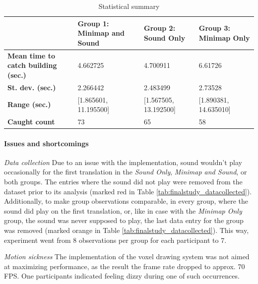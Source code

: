 \begin{table}[h]
	\caption{Statistical summary}
	\label{tab:final_study_stats}
	
	\begin{tabularx}{\linewidth}{|X|X|X|X|}
		\hline
		& \textbf{Group 1: Minimap and Sound} & \textbf{Group 2: Sound Only} & \textbf{Group 3: Minimap Only} \\ \hline
		\textbf{Mean time to catch building (sec.)}  & 4.662725                            & 4.700911                     & 6.61726                        \\ \hline
		\textbf{St. dev. (sec.)}  & 2.266442                            & 2.483499                     & 2.73528                        \\ \hline
		\textbf{Range (sec.)} & {[}1.865601, 11.195500{]}           & {[}1.567505, 13.192500{]}    & {[}1.890381, 14.635010{]}      \\ \hline
		\textbf{Caught count}  & 73                                  & 65                           & 58                             \\ \hline
	\end{tabularx}
\end{table}

\paragraph{Issues and shortcomings} \hfill

\textit{Data collection} Due to an issue with the implementation, sound wouldn't play occasionally for the first translation in the \textit{Sound Only}, \textit{Minimap and Sound}, or both groups. The entries where the sound did not play were removed from the dataset prior to its analysis (marked red in Table \ref{tab:finalstudy_datacollected}). Additionally, to make group observations comparable, in every group, where the sound did play on the first translation, or, like in case with the \textit{Minimap Only} group, the sound was never supposed to play, the last data entry for the group was removed (marked orange in Table \ref{tab:finalstudy_datacollected}). This way, experiment went from 8 observations per group for each participant to 7.

\textit{Motion sickness} The implementation of the voxel drawing system was not aimed at maximizing performance, as the result the frame rate dropped to approx. 70 FPS. One participants indicated feeling dizzy during one of such occurrences.

